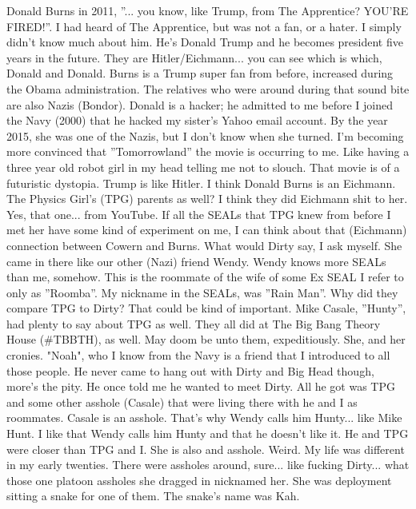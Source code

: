 \documentclass{article}
\begin{document}
\begin{multicols}{2}
Donald Burns in 2011, ''... you know, like Trump, from The Apprentice? YOU'RE FIRED!''. I had heard of The Apprentice, but was not a fan, or a hater. I simply didn't know much about him. He's Donald Trump and he becomes president five years in the future. They are Hitler/Eichmann... you can see which is which, Donald and Donald. Burns is a Trump super fan from before, increased during the Obama administration. The relatives who were around during that sound bite are also Nazis (Bondor). Donald is a hacker; he admitted to me before I joined the Navy (2000) that he hacked my sister's Yahoo email account. By the year 2015, she was one of the Nazis, but I don't know when she turned. I'm becoming more convinced that ''Tomorrowland'' the movie \cite{somemorenews} is occurring to me. Like having a three year old robot girl in my head telling me not to slouch. That movie is of a futuristic dystopia. Trump is like Hitler. I think Donald Burns is an Eichmann. The Physics Girl's (TPG) parents as well? I think they did Eichmann shit to her. Yes, that one... from YouTube. If all the SEALs that TPG knew from before I met her have some kind of experiment on me, I can think about that (Eichmann) connection between Cowern and Burns. What would Dirty say, I ask myself. She came in there like our other (Nazi) friend Wendy. Wendy knows more SEALs than me, somehow. This is the roommate of the wife of some Ex SEAL I refer to only as ''Roomba''. My nickname in the SEALs, was ''Rain Man''. Why did they compare TPG to Dirty? That could be kind of important. Mike Casale, ''Hunty'', had plenty to say about TPG as well. They all did at The Big Bang Theory House (\#TBBTH), as well. May doom be unto them, expeditiously. She, and her cronies. "Noah", who I know from the Navy is a friend that I introduced to all those people. He never came to hang out with Dirty and Big Head though, more's the pity. He once told me he wanted to meet Dirty. All he got was TPG and some other asshole (Casale) that were living there with he and I as roommates. Casale is an asshole. That's why Wendy calls him Hunty... like Mike Hunt. I like that Wendy calls him Hunty and that he doesn't like it. He and TPG were closer than TPG and I. She is also and asshole. Weird. My life was different in my early twenties. There were assholes around, sure... like fucking Dirty... what those one platoon assholes she dragged in nicknamed her. She was deployment sitting a snake for one of them. The snake's name was Kah.


\end{multicols}
\end{document}
